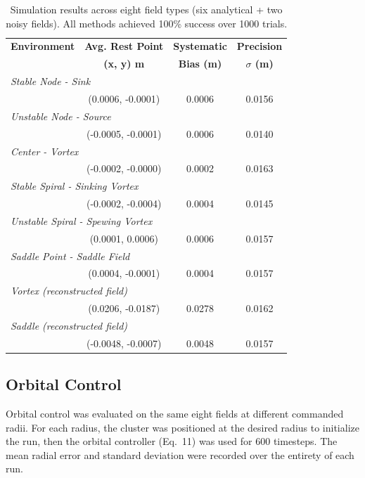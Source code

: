 \documentclass[lettersize,journal]{IEEEtran}
\begin{document}
\begin{table}[!t]
\footnotesize
\centering
\caption{Simulation results across eight field types (six analytical + two noisy fields). All methods achieved 100\% success over 1000 trials.}
\label{tab:simulation_estimation_results}
\setlength{\tabcolsep}{4pt}
\begin{tabular}{lccc}
\hline
\textbf{Environment} & \textbf{Avg. Rest Point} & \textbf{Systematic} & \textbf{Precision} \\
 & \textbf{(x, y) m} & \textbf{Bias (m)} & \textbf{$\sigma$ (m)} \\
\hline
\multicolumn{4}{l}{\textit{Stable Node - Sink}} \\
\hline
 & (0.0006, -0.0001) & 0.0006 & 0.0156 \\
\hline
\multicolumn{4}{l}{\textit{Unstable Node - Source}} \\
\hline
 & (-0.0005, -0.0001) & 0.0006 & 0.0140 \\
\hline
\multicolumn{4}{l}{\textit{Center - Vortex}} \\
\hline
 & (-0.0002, -0.0000) & 0.0002 & 0.0163 \\
\hline
\multicolumn{4}{l}{\textit{Stable Spiral - Sinking Vortex}} \\
\hline
 & (-0.0002, -0.0004) & 0.0004 & 0.0145 \\
\hline
\multicolumn{4}{l}{\textit{Unstable Spiral - Spewing Vortex}} \\
\hline
 & (0.0001, 0.0006) & 0.0006 & 0.0157 \\
\hline
\multicolumn{4}{l}{\textit{Saddle Point - Saddle Field}} \\
\hline
 & (0.0004, -0.0001) & 0.0004 & 0.0157 \\
\hline
\multicolumn{4}{l}{\textit{Vortex (reconstructed field)}} \\
\hline
 & (0.0206, -0.0187) & 0.0278 & 0.0162 \\
\hline
\multicolumn{4}{l}{\textit{Saddle (reconstructed field)}} \\
\hline
 & (-0.0048, -0.0007) & 0.0048 & 0.0157 \\
\hline
\end{tabular}
\end{table}


\subsection{Orbital Control}

Orbital control was evaluated on the same eight fields at different commanded radii. For each radius, the cluster was positioned at the desired radius to initialize the run, then the orbital controller (Eq.~11) was used for 600 timesteps. The mean radial error and standard deviation were recorded over the entirety of each
run.
\end{document}
